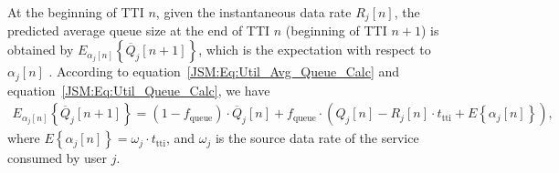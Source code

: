 \begin{apendicesenv}
At the beginning of \ac{TTI} $n$, given the instantaneous data rate $R_j\left[n\right]$, the predicted average queue size at the end of \ac{TTI} $n$ (beginning of \ac{TTI} $n+1$) is obtained by $E_{\alpha_j{\left[n\right]}}\left\{\overline{Q}_{j}\left[n+1\right]\right\}$, which is the expectation with respect to $\alpha_j{\left[n\right]}$ \cite{song2004joint}. 
According to equation~\eqref{JSM:Eq:Util_Avg_Queue_Calc} and equation~\eqref{JSM:Eq:Util_Queue_Calc}, we have 
% 
\begin{align}
\label{JSM:Eq:Util_Expected_Queue_Calc}
E_{\alpha_j{\left[n\right]}}\left\{\overline{Q}_{j}\left[n+1\right]\right\} = \left(1 - f_{\mathrm{queue}}\right) \cdot \overline{Q}_{j}\left[n\right] + f_{\mathrm{queue}}  \cdot \left( Q_{j}\left[n\right] - R_j\left[n\right] \cdot t_{\mathrm{tti}} + E\left\{\alpha_j{\left[n\right]}\right\} \right),
\end{align}
%
where $E\left\{\alpha_j{\left[n\right]}\right\}=\omega_j \cdot t_{\mathrm{tti}}$, and $\omega_j$ is the source data rate of the service consumed by user $j$.


\end{apendicesenv}

